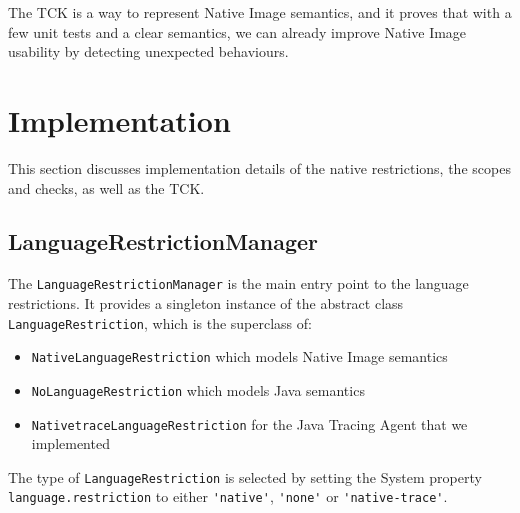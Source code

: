 The TCK is a way to represent Native Image semantics, and it proves that with a few unit tests and a clear semantics, we can already improve Native Image usability by detecting unexpected behaviours.


\chapter{Implementation}

This section discusses implementation details of the native restrictions, the scopes and checks, as well as the TCK.

\section{LanguageRestrictionManager}
The \verb|LanguageRestrictionManager| is the main entry point to the language restrictions. It provides a singleton instance of the abstract class \verb|LanguageRestriction|, which is the superclass of: 
\begin{itemize}
    \item \texttt{NativeLanguageRestriction} which models Native Image semantics
    \item \texttt{NoLanguageRestriction} which  models Java semantics
    \item \texttt{NativetraceLanguageRestriction} for the Java Tracing Agent that we implemented
\end{itemize}
The type of \verb|LanguageRestriction| is selected by setting the System property \verb|language.restriction| to either \verb|'native'|, \verb|'none'| or \verb|'native-trace'|. 

